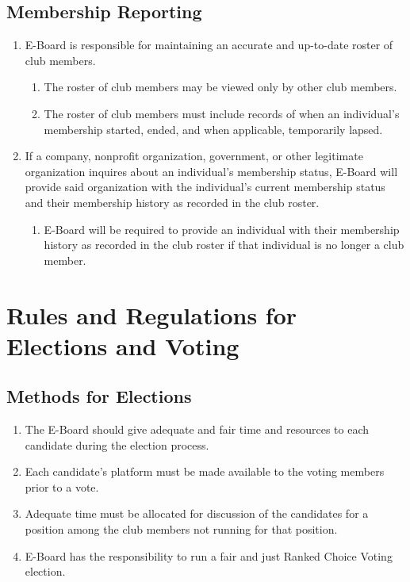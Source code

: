 \documentclass{article}
\begin{document}
\subsection{Membership Reporting}

\begin{enumerate}
  \item E-Board is responsible for maintaining an accurate and up-to-date
    roster of club members.
  \begin{enumerate}
    \item The roster of club members may be viewed only by other club members.
    \item The roster of club members must include records of when an
      individual's membership started, ended, and when applicable, temporarily
      lapsed.
  \end{enumerate}
  \item If a company, nonprofit organization, government, or other legitimate
    organization inquires about an individual's membership status, E-Board will
    provide said organization with the individual's current membership status
    and their membership history as recorded in the club roster.
  \begin{enumerate}
    \item E-Board will be required to provide an individual with their
      membership history as recorded in the club roster if that individual is
      no longer a club member.
  \end{enumerate}
\end{enumerate}


\section{Rules and Regulations for Elections and Voting}

\subsection{Methods for Elections}

\begin{enumerate}
  \item The E-Board should give adequate and fair time and resources to each
    candidate during the election process.
  \item Each candidate's platform must be made available to the voting members
    prior to a vote.
  \item Adequate time must be allocated for discussion of the candidates for a
    position among the club members not running for that position.
  \item E-Board has the responsibility to run a fair and just Ranked Choice
    Voting election.
\end{enumerate}
\end{document}

